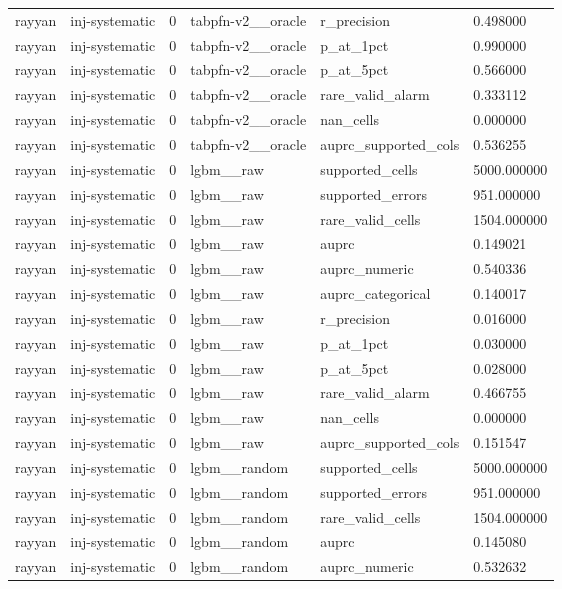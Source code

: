 \begin{tabular}{llllll}
rayyan & inj-systematic & 0 & tabpfn-v2\_\_oracle & r\_precision & 0.498000 \\
rayyan & inj-systematic & 0 & tabpfn-v2\_\_oracle & p\_at\_1pct & 0.990000 \\
rayyan & inj-systematic & 0 & tabpfn-v2\_\_oracle & p\_at\_5pct & 0.566000 \\
rayyan & inj-systematic & 0 & tabpfn-v2\_\_oracle & rare\_valid\_alarm & 0.333112 \\
rayyan & inj-systematic & 0 & tabpfn-v2\_\_oracle & nan\_cells & 0.000000 \\
rayyan & inj-systematic & 0 & tabpfn-v2\_\_oracle & auprc\_supported\_cols & 0.536255 \\
rayyan & inj-systematic & 0 & lgbm\_\_raw & supported\_cells & 5000.000000 \\
rayyan & inj-systematic & 0 & lgbm\_\_raw & supported\_errors & 951.000000 \\
rayyan & inj-systematic & 0 & lgbm\_\_raw & rare\_valid\_cells & 1504.000000 \\
rayyan & inj-systematic & 0 & lgbm\_\_raw & auprc & 0.149021 \\
rayyan & inj-systematic & 0 & lgbm\_\_raw & auprc\_numeric & 0.540336 \\
rayyan & inj-systematic & 0 & lgbm\_\_raw & auprc\_categorical & 0.140017 \\
rayyan & inj-systematic & 0 & lgbm\_\_raw & r\_precision & 0.016000 \\
rayyan & inj-systematic & 0 & lgbm\_\_raw & p\_at\_1pct & 0.030000 \\
rayyan & inj-systematic & 0 & lgbm\_\_raw & p\_at\_5pct & 0.028000 \\
rayyan & inj-systematic & 0 & lgbm\_\_raw & rare\_valid\_alarm & 0.466755 \\
rayyan & inj-systematic & 0 & lgbm\_\_raw & nan\_cells & 0.000000 \\
rayyan & inj-systematic & 0 & lgbm\_\_raw & auprc\_supported\_cols & 0.151547 \\
rayyan & inj-systematic & 0 & lgbm\_\_random & supported\_cells & 5000.000000 \\
rayyan & inj-systematic & 0 & lgbm\_\_random & supported\_errors & 951.000000 \\
rayyan & inj-systematic & 0 & lgbm\_\_random & rare\_valid\_cells & 1504.000000 \\
rayyan & inj-systematic & 0 & lgbm\_\_random & auprc & 0.145080 \\
rayyan & inj-systematic & 0 & lgbm\_\_random & auprc\_numeric & 0.532632 \\

\end{tabular}
